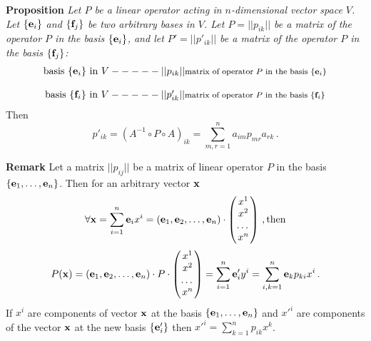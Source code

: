 \documentclass[12pt]{article}
\numberwithin{equation}{section}
\begin{document}
\smallskip

{\bf Proposition}  {\it Let $P$ be a linear operator acting in $n$-dimensional
vector space $V$. 
 Let $\{{\bf e}_i\}$ and $\{{\bf f}_j\}$ be two  arbitrary bases in $V$.
   Let
        $P=||p_{ik}||$ be a matrix of the operator $P$ in the basis
   $\{{\bf e}_i\}$, and
   let
        $P'=||p'_{ik}||$ be a matrix of the operator $P$ in the basis
   $\{{\bf f}_j\}$: 
              }
                      \begin{equation*}
                  \begin{matrix}     
 \hbox {basis $\{{{\bf e}_i}\}$ in $V$} 
  -----   
\hbox {$||p_{ik}||$\footnotesize
{matrix of operator $P$ in the basis $\{{\bf e}_i\}$}}\cr
          \cr
  \hbox {basis $\{{{\bf f}_i}\}$ in $V$} 
  -----   
\hbox {$||p'_{ik}||$\footnotesize
{matrix of operator $P$ in the basis $\{{\bf f}_i\}$}}\cr
  
       \end{matrix}
                      \end{equation*}
Then
       \begin{equation}\label{changingofmatrix}
                p'_{ik}=(A^{-1}\circ P\circ A)_{ik}=
                \sum_{m,r=1}^n a_{im}p_{mr} a_{rk}\,. 
             \end{equation}



\m

{\bf Remark}
Let a matrix $||p_{ij}||$  be a  matrix
of linear operator $P$ in the basis 
$\{{\bf e}_1,\dots,{\bf e}_n\}$. Then for an arbitrary vector ${\bf x}$
             \begin{equation*}
 \forall {\bf x}=\sum_{i=1}^n{\bf e}_i x^i=({\bf e}_1,{\bf e}_2,\dots,{\bf e}_n)\cdot
 \begin{pmatrix}
 x^1\cr x^2\cr \dots \cr x^n\cr
 \end{pmatrix}\,,\hbox {then}
             \end{equation*}
\begin{equation*}\label{linearoperatorin terms oftransition matrix2}
 P({\bf x})=({\bf e}_1,{\bf e}_2,\dots,{\bf e}_n)\cdot P\cdot
 \begin{pmatrix}
 x^1\cr x^2\cr \dots \cr x^n\cr
 \end{pmatrix}=\sum_{i=1}^n{\bf e}'_i y^i=\sum_{i,k=1}^n{\bf e}_k p_{ki} x^i\,.
             \end{equation*}
If $x^i$ are components of vector ${\bf x}$ at the basis $\{{\bf e}_1,\dots,{\bf e}_n\}$
and  $x'^i$ are components of the vector ${\bf x}$ at the new basis
$\{{\bf e}'_i\}$ then $x'^i=\sum_{k=1}^n p_{ik}x^k$.
\end{document}
